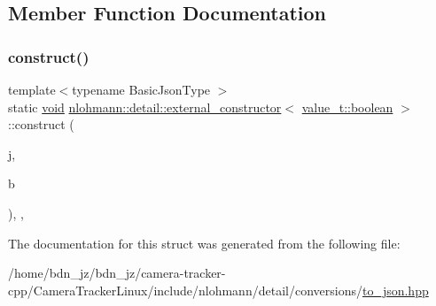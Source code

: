 \subsection{Member Function Documentation}
\mbox{\label{structnlohmann_1_1detail_1_1external__constructor_3_01value__t_1_1boolean_01_4_a867122bcf0856c757bd6bcbfb8be74bc}} 
\subsubsection{\texorpdfstring{construct()}{construct()}}
{\footnotesize\ttfamily template$<$typename Basic\+Json\+Type $>$ \\
static \hyperlink{namespacenlohmann_1_1detail_a59fca69799f6b9e366710cb9043aa77d}{void} \hyperlink{structnlohmann_1_1detail_1_1external__constructor}{nlohmann\+::detail\+::external\+\_\+constructor}$<$ \hyperlink{namespacenlohmann_1_1detail_a1ed8fc6239da25abcaf681d30ace4985a84e2c64f38f78ba3ea5c905ab5a2da27}{value\+\_\+t\+::boolean} $>$\+::construct (\begin{DoxyParamCaption}\item[{Basic\+Json\+Type \&}]{j,  }\item[{typename Basic\+Json\+Type\+::boolean\+\_\+t}]{b }\end{DoxyParamCaption})\hspace{0.3cm}{\ttfamily [inline]}, {\ttfamily [static]}, {\ttfamily [noexcept]}}



The documentation for this struct was generated from the following file\+:\begin{DoxyCompactItemize}
\item 
/home/bdn\+\_\+jz/bdn\+\_\+jz/camera-\/tracker-\/cpp/\+Camera\+Tracker\+Linux/include/nlohmann/detail/conversions/\hyperlink{to__json_8hpp}{to\+\_\+json.\+hpp}\end{DoxyCompactItemize}
